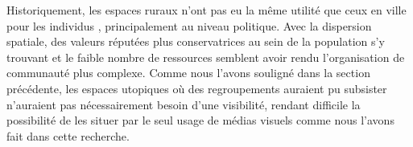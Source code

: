 Historiquement, les espaces ruraux n'ont pas eu la même utilité que ceux en ville pour les individus \lgbt{}, principalement au niveau politique.
Avec la dispersion spatiale, des valeurs réputées plus conservatrices au sein de la population s'y trouvant et le faible nombre de ressources semblent avoir rendu l'organisation de communauté \lgbt{} plus complexe.
Comme nous l'avons souligné dans la section précédente, les espaces utopiques où des regroupements \lgbt{} auraient pu subsister n'auraient pas nécessairement besoin d'une visibilité, rendant difficile la possibilité de les situer par le seul usage de médias visuels comme nous l'avons fait dans cette recherche.

